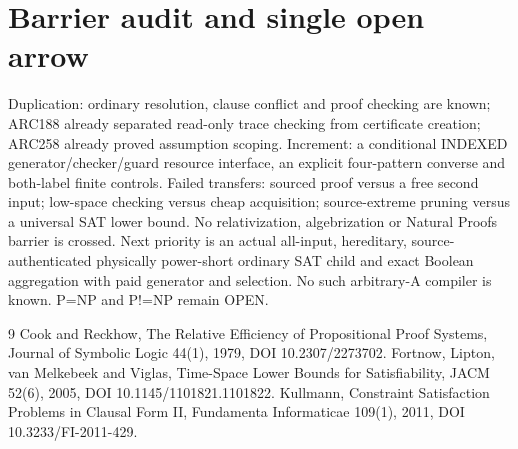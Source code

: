 \documentclass[11pt]{article}
\begin{document}
\section{Barrier audit and single open arrow}
Duplication: ordinary resolution, clause conflict and proof checking are known; ARC188 already separated read-only trace checking from certificate creation; ARC258 already proved assumption scoping. Increment: a conditional INDEXED generator/checker/guard resource interface, an explicit four-pattern converse and both-label finite controls. Failed transfers: sourced proof versus a free second input; low-space checking versus cheap acquisition; source-extreme pruning versus a universal SAT lower bound. No relativization, algebrization or Natural Proofs barrier is crossed. Next priority is an actual all-input, hereditary, source-authenticated physically power-short ordinary SAT child and exact Boolean aggregation with paid generator and selection. No such arbitrary-A compiler is known. P=NP and P!=NP remain OPEN.
\begin{thebibliography}{9}
 Cook and Reckhow, The Relative Efficiency of Propositional Proof Systems, Journal of Symbolic Logic 44(1), 1979, DOI 10.2307/2273702.
 Fortnow, Lipton, van Melkebeek and Viglas, Time-Space Lower Bounds for Satisfiability, JACM 52(6), 2005, DOI 10.1145/1101821.1101822.
 Kullmann, Constraint Satisfaction Problems in Clausal Form II, Fundamenta Informaticae 109(1), 2011, DOI 10.3233/FI-2011-429.
\end{thebibliography}
\end{document}
